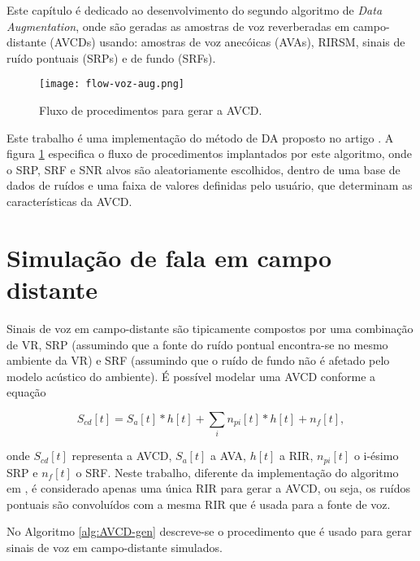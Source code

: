 Este capítulo é dedicado ao desenvolvimento do segundo algoritmo de \textit{Data Augmentation}, onde são geradas as amostras de voz 
reverberadas em campo-distante (AVCDs) usando: amostras de voz anecóicas (AVAs), RIRSM, sinais de ruído pontuais (SRPs) e de fundo (SRFs).

\begin{figure} [H]
    \centering
    \texttt{[image: flow-voz-aug.png]}
    \caption{Fluxo de procedimentos para gerar a AVCD.} 
    \label{fig:flow-voz-rev}
\end{figure}

Este trabalho é uma implementação do método de DA proposto no artigo \cite{Speech_Rec}. A figura \ref{fig:flow-voz-rev} especifica 
o fluxo de procedimentos implantados por este algoritmo, onde o SRP, SRF e SNR alvos são aleatoriamente escolhidos, 
dentro de uma base de dados de ruídos e uma faixa de valores definidas pelo usuário, que determinam as características da AVCD. 

\section{Simulação de fala em campo distante} 

Sinais de voz em campo-distante são tipicamente compostos por uma combinação de VR, SRP (assumindo que a fonte do ruído pontual encontra-se 
no mesmo ambiente da VR) e SRF (assumindo que o ruído de fundo não é afetado pelo modelo acústico do ambiente).
É possível modelar uma AVCD conforme a equação

\begin{equation} \label{eqn:AVCD-model}
    S_{cd}[t] = S_a[t] \ast h[t] + \sum_i n_{pi}[t] \ast h[t] + n_f[t]
    ,
\end{equation}

\noindent
onde $S_{cd}[t]$ representa a AVCD, $S_a[t]$ a AVA, $h[t]$ a RIR, $n_{pi}[t]$ o i-ésimo SRP e $n_f[t]$ o SRF.
Neste trabalho, diferente da implementação do algoritmo em \cite{Speech_Rec}, é considerado apenas uma única RIR
para gerar a AVCD, ou seja, os ruídos pontuais são convoluídos com a mesma RIR que é usada para a fonte de voz.

No Algoritmo \ref{alg:AVCD-gen} descreve-se o procedimento que é usado para gerar sinais de voz em campo-distante simulados. 
\bigbreak
\bigbreak

